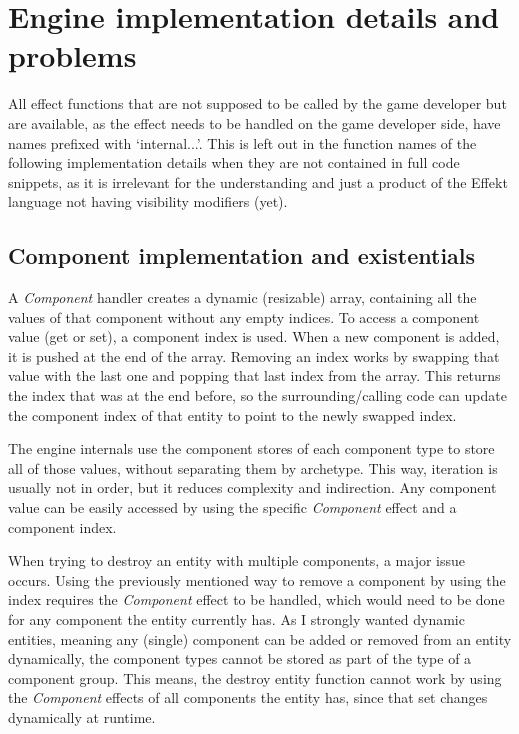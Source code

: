 \chapter{Engine implementation details and problems}\label{chap:details}

All effect functions that are not supposed to be called by the game developer but are available, as the effect needs to be handled on the game developer side, have names prefixed with `internal...'. This is left out in the function names of the following implementation details when they are not contained in full code snippets, as it is irrelevant for the understanding and just a product of the Effekt language not having visibility modifiers (yet).

\section{Component implementation and existentials}

A \textit{Component} handler creates a dynamic (resizable) array, containing all the values of that component without any empty indices. To access a component value (get or set), a component index is used. When a new component is added, it is pushed at the end of the array. Removing an index works by swapping that value with the last one and popping that last index from the array. This returns the index that was at the end before, so the surrounding/calling code can update the component index of that entity to point to the newly swapped index.

The engine internals use the component stores of each component type to store all of those values, without separating them by archetype. This way, iteration is usually not in order, but it reduces complexity and indirection. Any component value can be easily accessed by using the specific \textit{Component} effect and a component index.

When trying to destroy an entity with multiple components, a major issue occurs. Using the previously mentioned way to remove a component by using the index requires the \textit{Component} effect to be handled, which would need to be done for any component the entity currently has. As I strongly wanted dynamic entities, meaning any (single) component can be added or removed from an entity dynamically, the component types cannot be stored as part of the type of a component group. This means, the destroy entity function cannot work by using the \textit{Component} effects of all components the entity has, since that set changes dynamically at runtime.

